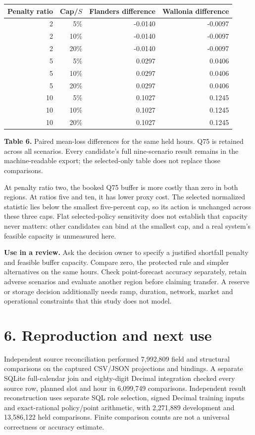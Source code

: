 \documentclass[10pt,letterpaper]{article}
\begin{document}
\begin{center}\begin{tabular}{rrrr}\toprule
Penalty ratio & Cap/$S$ & Flanders difference & Wallonia difference\\\midrule
2 & 5\% & -0.0140 & -0.0097 \\
2 & 10\% & -0.0140 & -0.0097 \\
2 & 20\% & -0.0140 & -0.0097 \\
5 & 5\% & 0.0297 & 0.0406 \\
5 & 10\% & 0.0297 & 0.0406 \\
5 & 20\% & 0.0297 & 0.0406 \\
10 & 5\% & 0.1027 & 0.1245 \\
10 & 10\% & 0.1027 & 0.1245 \\
10 & 20\% & 0.1027 & 0.1245 \\
\bottomrule\end{tabular}\end{center}
\textbf{Table 6.} Paired mean-loss differences for the same held hours. Q75 is retained across all scenarios. Every candidate's full nine-scenario result remains in the machine-readable export; the selected-only table does not replace those comparisons.

At penalty ratio two, the booked Q75 buffer is more costly than zero in both regions. At ratios five and ten, it has lower proxy cost. The selected normalized statistic lies below the smallest five-percent cap, so its action is unchanged across these three caps. Flat selected-policy sensitivity does not establish that capacity never matters: other candidates can bind at the smallest cap, and a real system's feasible capacity is unmeasured here.

\textbf{Use in a review.} Ask the decision owner to specify a justified shortfall penalty and feasible buffer capacity. Compare zero, the protected rule and simpler alternatives on the same hours. Check point-forecast accuracy separately, retain adverse scenarios and evaluate another region before claiming transfer. A reserve or storage decision additionally needs ramp, duration, network, market and operational constraints that this study does not model.
\newpage
\section*{6. Reproduction and next use}
Independent source reconciliation performed 7,992,809 field and structural comparisons on the captured CSV/JSON projections and bindings. A separate SQLite full-calendar join and eighty-digit Decimal integration checked every source row, planned slot and hour in 6,099,749 comparisons. Independent result reconstruction uses separate SQL role selection, signed Decimal training inputs and exact-rational policy/point arithmetic, with 2,271,889 development and 13,586,122 held comparisons. Finite comparison counts are not a universal correctness or accuracy estimate.
\end{document}
